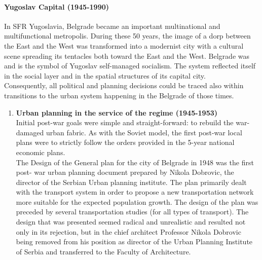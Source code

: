 \documentclass[11pt]{report}
\begin{document}
{{{{\paragraph{Yugoslav Capital (1945-1990)}

In SFR Yugoslavia, Belgrade became an important multinational and multifunctional metropolis. During these 50 years, the image of a dorp between the East and the West was transformed into a modernist city with a cultural scene spreading its tentacles both toward the East and the West. Belgrade was and is the symbol of Yugoslav self-managed socialism. The system reflected itself in the social layer and in the spatial structures of its capital city.
\\

Consequently, all political and planning decisions could be traced also within transitions to the urban system happening in the Belgrade of those times.

\begin{enumerate}
\item \textbf{Urban planning in the service of the regime  (1945-1953)}
\\
Initial post-war goals were simple and straight-forward: to rebuild the war-damaged urban fabric. As with the Soviet model, the first post-war local plans were to strictly follow the orders provided in the 5-year national economic plans. 
\\

The Design of the General plan for the city of Belgrade in 1948 was the first post- war urban planning document prepared by Nikola Dobrovic, the director of the Serbian Urban planning institute. The plan primarily dealt with the transport system in order to propose a new transportation network more suitable for the expected population growth. The design of the plan was preceded by several transportation studies (for all types of transport). The  design that was presented seemed radical and unrealistic and resulted not only in its rejection, but in the chief architect Professor Nikola Dobrovic being removed from his position as director of the Urban Planning Institute of Serbia and transferred to the Faculty of Architecture.


\end{enumerate}}}}}
\end{document}
